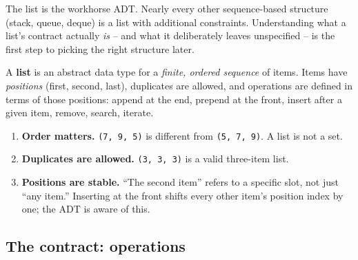 \documentclass[11pt]{article}
\begin{document}
The list is the workhorse ADT. Nearly every other sequence-based
structure (stack, queue, deque) is a list with additional
constraints. Understanding what a list's contract actually
\emph{is} -- and what it deliberately leaves unspecified -- is the
first step to picking the right structure later.

\begin{defnbox}[List]
A \textbf{list} is an abstract data type for a \emph{finite, ordered
sequence} of items. Items have \emph{positions} (first, second, last),
duplicates are allowed, and operations are defined in terms of those
positions: append at the end, prepend at the front, insert after a
given item, remove, search, iterate.
\end{defnbox}

\begin{ideabox}
\begin{enumerate}[leftmargin=*]
  \item \textbf{Order matters.} \texttt{(7, 9, 5)} is different from
        \texttt{(5, 7, 9)}. A list is not a set.
  \item \textbf{Duplicates are allowed.} \texttt{(3, 3, 3)} is a
        valid three-item list.
  \item \textbf{Positions are stable.} ``The second item'' refers to
        a specific slot, not just ``any item.'' Inserting at the
        front shifts every other item's position index by one;
        the ADT is aware of this.
\end{enumerate}
\end{ideabox}

\subsection{The contract: operations}
\end{document}
